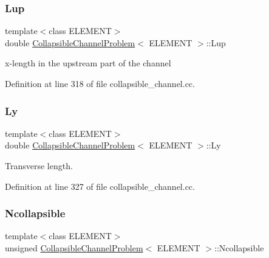 \mbox{\label{classCollapsibleChannelProblem_a56353f52e7cf1564ffe77373ead3c2d0}} 
\subsubsection{\texorpdfstring{Lup}{Lup}}
{\footnotesize\ttfamily template$<$class E\+L\+E\+M\+E\+NT$>$ \\
double \hyperlink{classCollapsibleChannelProblem}{Collapsible\+Channel\+Problem}$<$ E\+L\+E\+M\+E\+NT $>$\+::Lup\hspace{0.3cm}{\ttfamily [private]}}



x-\/length in the upstream part of the channel 



Definition at line 318 of file collapsible\+\_\+channel.\+cc.

\mbox{\label{classCollapsibleChannelProblem_a7d600ad0b7326eda8d3bcbfde97b40cd}} 
\subsubsection{\texorpdfstring{Ly}{Ly}}
{\footnotesize\ttfamily template$<$class E\+L\+E\+M\+E\+NT$>$ \\
double \hyperlink{classCollapsibleChannelProblem}{Collapsible\+Channel\+Problem}$<$ E\+L\+E\+M\+E\+NT $>$\+::Ly\hspace{0.3cm}{\ttfamily [private]}}



Transverse length. 



Definition at line 327 of file collapsible\+\_\+channel.\+cc.

\mbox{\label{classCollapsibleChannelProblem_a941d6703a949d3a2f73b24080ca34bab}} 
\subsubsection{\texorpdfstring{Ncollapsible}{Ncollapsible}}
{\footnotesize\ttfamily template$<$class E\+L\+E\+M\+E\+NT$>$ \\
unsigned \hyperlink{classCollapsibleChannelProblem}{Collapsible\+Channel\+Problem}$<$ E\+L\+E\+M\+E\+NT $>$\+::Ncollapsible\hspace{0.3cm}{\ttfamily [private]}}



